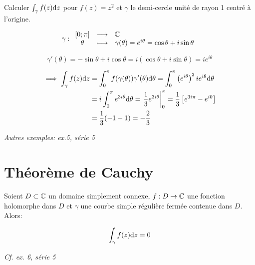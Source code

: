 \begin{example}
    Calculer $\int_\gamma f(z) \mathrm{d}z$ pour $f(z) = z^2$ et $\gamma$ le demi-cercle unité de rayon 1 centré à l'origine.
    
    \[
    \gamma:
    \begin{array}{ccl}
    [0;\pi] & \longrightarrow & \mathbb{C} \\
    \theta & \longmapsto & \gamma(\theta) = e^{i\theta} = \cos \theta + i \sin \theta
    \end{array}
    \]
    
    \[
    \gamma'(\theta) = -\sin \theta + i \cos \theta = i(\cos \theta + i \sin \theta) = i e^{i\theta}
    \]
    
    \begin{align*}
    \implies \int_\gamma f(z) \mathrm{d}z &= \int_0^\pi f(\gamma(\theta)) \gamma'(\theta) \mathrm{d}\theta = \int_0^\pi \left(e^{i\theta}\right)^2 i e^{i\theta} \mathrm{d}\theta
    \\&=
    i \int_0^\pi e^{3i\theta} \mathrm{d}\theta = \left.\frac{1}{3} e^{3i\theta} \right|_0^\pi = \frac{1}{3} \left[e^{3i\pi} - e^{i0}\right]
    \\&=
    \frac{1}{3} (-1-1) = -\frac{2}{3}
    \end{align*}
    
    \textit{Autres exemples: ex.5, série 5}
\end{example}


\section{Théorème de Cauchy}

\begin{theorem}
    Soient $D \subset \mathbb{C}$ un domaine simplement connexe, $f: D \rightarrow \mathbb{C}$ une fonction holomorphe dans $D$ et $\gamma$ une courbe simple régulière fermée contenue dans $D$.
    Alors:
    
    \[\int_\gamma f(z) \mathrm{d}z = 0\]
    
    \textit{Cf. ex. 6, série 5}
\end{theorem}
